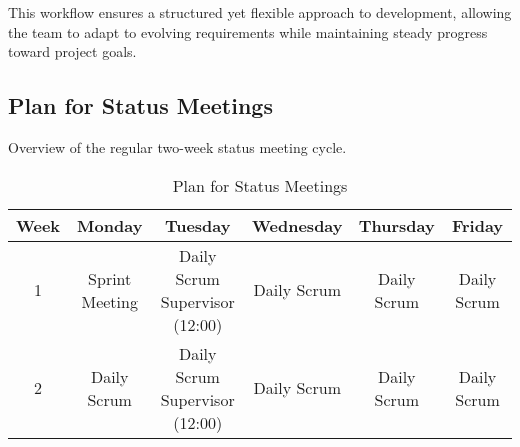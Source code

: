 This workflow ensures a structured yet flexible approach to development, allowing the team to adapt to evolving requirements while maintaining steady progress toward project goals.


\subsection{Plan for Status Meetings}
Overview of the regular two-week status meeting cycle.
\begin{table}[H]
    \centering
    \begin{tabular}{|c|c|c|c|c|c|}
    \hline
    Week & Monday & Tuesday & Wednesday & Thursday & Friday \\
    \hline
    1 & Sprint Meeting & \makecell{Daily Scrum \\ Supervisor (12:00)} & Daily Scrum & Daily 
    Scrum & Daily Scrum \\
    \hline
    2 & Daily Scrum & \makecell{Daily Scrum \\ Supervisor (12:00)} & Daily Scrum & Daily 
    Scrum & Daily Scrum \\
    \hline
    \end{tabular}
    \caption{Plan for Status Meetings}
    \label{tab:meeting_plan}
\end{table}
